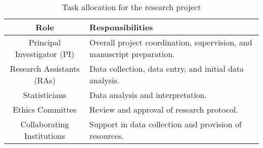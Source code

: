 \begin{table}[h!]
    \centering
    \begin{tabularx}{\textwidth}{|c|X|}
        \hline
        \textbf{Role} & \textbf{Responsibilities} \\
        \hline
        Principal Investigator (PI) & Overall project coordination, supervision, and manuscript preparation. \\
        Research Assistants (RAs) & Data collection, data entry, and initial data analysis. \\
        Statisticians & Data analysis and interpretation. \\
        Ethics Committee & Review and approval of research protocol. \\
        Collaborating Institutions & Support in data collection and provision of resources. \\
        \hline
    \end{tabularx}
    \caption{Task allocation for the research project}
    \label{tab:task_allocation}
\end{table}